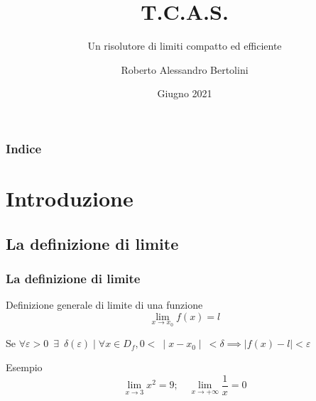 \documentclass[aspectratio=149]{beamer}
\title{T.C.A.S.}
\author[Roberto Bertolini]{Roberto Alessandro Bertolini}
\institute[Liceo Nervi Ferrari]{Liceo "P. Nervi - G. Ferrari" - Morbegno}
\date{Giugno 2021}
\subtitle{Un risolutore di limiti compatto ed efficiente}
\begin{document}
	
	\begin{frame}
		\titlepage
	\end{frame}
	
	\begin{frame}
		\frametitle{Indice}
		\tableofcontents
	\end{frame}
	
	\section{Introduzione}
	
	\subsection{La definizione di limite}
	\begin{frame}
		\frametitle{La definizione di limite}
		\begin{block}{Definizione generale di limite di una funzione}
			\[ 
			\lim_{x \to x_{0}}{f(x) = l} 
			\]
			
			Se \( 
			\forall \varepsilon > 0 \enspace \exists \enspace \delta(\varepsilon) \mid \forall x \in D_{f}, 0 < \: \mid x - x_{0} \mid \: <\delta \implies \mid f(x) - l \mid < \varepsilon
			\)
		\end{block}
		\begin{exampleblock}{Esempio}
			\[
				\lim_{x \to 3}{x^2} = 9; \quad \lim_{x \to +\infty}{\frac{1}{x}} = 0
			\]
		\end{exampleblock}
	\end{frame}
	
\end{document}
